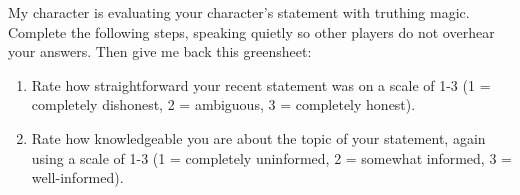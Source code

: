 \documentclass[green]{Kos}
\begin{document}
\name{\gTruthing{}}

My character is evaluating your character's statement with truthing magic. Complete the following steps, speaking quietly so other players do not overhear your answers. Then give me back this greensheet:

\begin{enumerate}
\item Rate how straightforward your recent statement was on a scale of 1-3 (1 = completely dishonest, 2 = ambiguous, 3 = completely honest). 
\item Rate how knowledgeable you are about the topic of your statement, again using a scale of 1-3 (1 = completely uninformed, 2 =  somewhat informed, 3 = well-informed). 
\end{enumerate}
\end{document}
